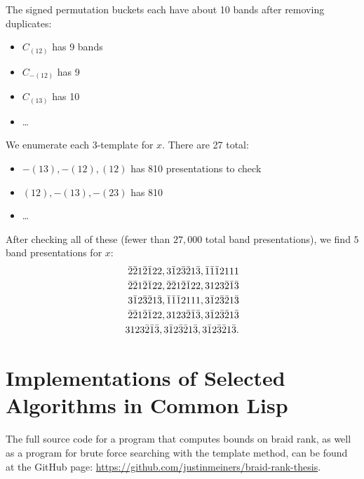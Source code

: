 \documentclass[12pt]{thesis}
\begin{document}
The signed permutation buckets each have about 10 bands after removing duplicates:
\begin{itemize}
    \item $C_{(1 2)}$ has 9 bands
    \item $C_{-(1 2)}$ has 9 
    \item $C_{(1 3)}$ has 10 
    \item \ldots
\end{itemize}

We enumerate each $3$-template for $x$.
There are 27 total:
\begin{itemize}
    \item $-(1 3), -(1 2), (1 2)$ has 810 presentations to check
    \item $(1  2), -(1 3), -(2  3)$ has 810
    \item \ldots
\end{itemize}
After checking all of these (fewer than $27,000$ total band presentations), we find $5$ band
presentations for $x$:
\[
\begin{split}
\bar{2}\bar{2}1\bar{2}\bar{1}22, 3\bar{1}2\bar{3}\bar{2}1\bar{3}, \bar{1}\bar{1}\bar{1}2111 \\
\bar{2}\bar{2}1\bar{2}\bar{1}22, \bar{2}\bar{2}1\bar{2}\bar{1}22, 3123\bar{2}\bar{1}\bar{3} \\
3\bar{1}2\bar{3}\bar{2}1\bar{3}, \bar{1}\bar{1}\bar{1}2111, 3\bar{1}2\bar{3}\bar{2}1\bar{3} \\
\bar{2}\bar{2}1\bar{2}\bar{1}22, 3123\bar{2}\bar{1}\bar{3}, 3\bar{1}2\bar{3}\bar{2}1\bar{3} \\
3123\bar{2}\bar{1}\bar{3}, 3\bar{1}2\bar{3}\bar{2}1\bar{3}, 3\bar{1}2\bar{3}\bar{2}1\bar{3}. \\
\end{split}
\]

\appendix

\chapter{Implementations of Selected Algorithms in Common Lisp}

The full source code for a program
that computes bounds on braid rank,
as well as a program for brute force searching with the template method,
can be found at the GitHub page: \url{https://github.com/justinmeiners/braid-rank-thesis}.
\end{document}
